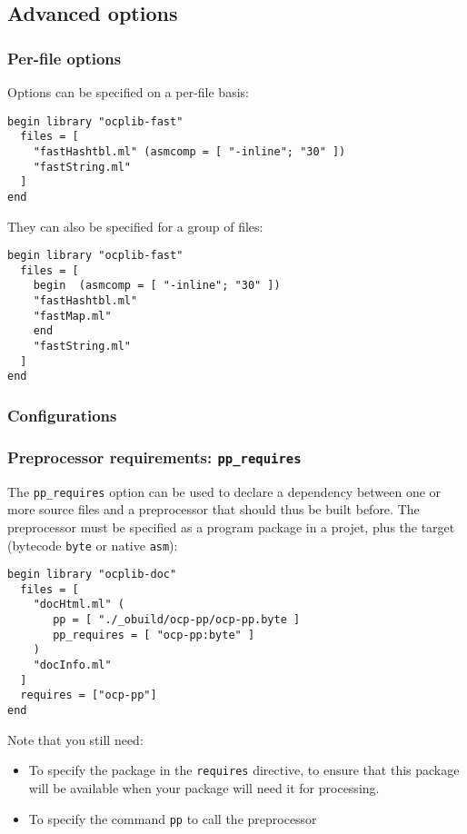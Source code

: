 \subsection{Advanced options}

\subsubsection{Per-file options}

Options can be specified on a per-file basis:

\begin{verbatim}
begin library "ocplib-fast"
  files = [
    "fastHashtbl.ml" (asmcomp = [ "-inline"; "30" ])
    "fastString.ml"
  ]
end
\end{verbatim}

They can also be specified for a group of files:

\begin{verbatim}
begin library "ocplib-fast"
  files = [
    begin  (asmcomp = [ "-inline"; "30" ])
    "fastHashtbl.ml"
    "fastMap.ml"
    end
    "fastString.ml"
  ]
end
\end{verbatim}


\subsubsection{Configurations}

\subsubsection{Preprocessor requirements: {\tt pp\_requires}}

The {\tt pp\_requires} option can be used to declare a dependency
between one or more source files and a preprocessor that should thus
be built before. The preprocessor must be specified as a program
package in a projet, plus the target (bytecode {\tt byte} or native
{\tt asm}):

\begin{verbatim}
begin library "ocplib-doc"
  files = [
    "docHtml.ml" (
       pp = [ "./_obuild/ocp-pp/ocp-pp.byte ]
       pp_requires = [ "ocp-pp:byte" ]
    )
    "docInfo.ml"
  ]
  requires = ["ocp-pp"]
end
\end{verbatim}

Note that you still need:
\begin{itemize}
\item To specify the package in the {\tt requires} directive, to ensure that
  this package will be available when your package will need it for processing.
\item To specify the command {\tt pp} to call the preprocessor
\end{itemize}

